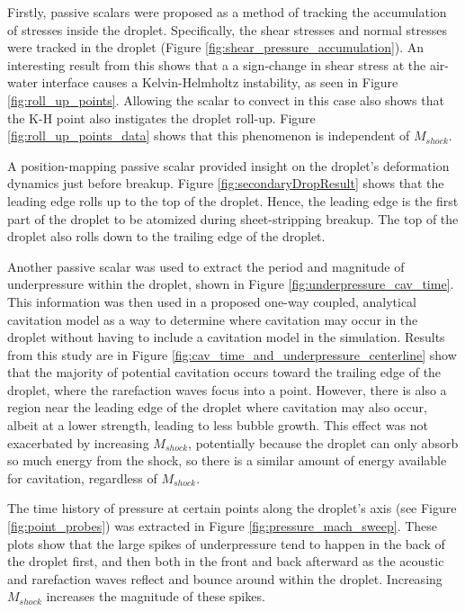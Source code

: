 \documentclass{UCF_ETD}
\begin{document}
Firstly, passive scalars were proposed as a method of tracking the accumulation of stresses inside the droplet. Specifically, the shear stresses and normal stresses were tracked in the droplet (Figure \ref{fig:shear_pressure_accumulation}). An interesting result from this shows that a a sign-change in shear stress at the air-water interface causes a Kelvin-Helmholtz instability, as seen in Figure \ref{fig:roll_up_points}. Allowing the scalar to convect in this case also shows that the K-H point also instigates the droplet roll-up. Figure \ref{fig:roll_up_points_data} shows that this phenomenon is independent of $M_{shock}$.

A position-mapping passive scalar provided insight on the droplet's deformation dynamics just before breakup. Figure \ref{fig:secondaryDropResult} shows that the leading edge rolls up to the top of the droplet. Hence, the leading edge is the first part of the droplet to be atomized during sheet-stripping breakup. The top of the droplet also rolls down to the trailing edge of the droplet. 

Another passive scalar was used to extract the period and magnitude of underpressure within the droplet, shown in Figure \ref{fig:underpressure_cav_time}. This information was then used in a proposed one-way coupled, analytical cavitation model as a way to determine where cavitation may occur in the droplet without having to include a cavitation model in the simulation. Results from this study are in Figure \ref{fig:cav_time_and_underpressure_centerline} show that the majority of potential cavitation occurs toward the trailing edge of the droplet, where the rarefaction waves focus into a point. However, there is also a region near the leading edge of the droplet where cavitation may also occur, albeit at a lower strength, leading to less bubble growth. This effect was not exacerbated by increasing $M_{shock}$, potentially because the droplet can only absorb so much energy from the shock, so there is a similar amount of energy available for cavitation, regardless of $M_{shock}$.

The time history of pressure at certain points along the droplet's axis (see Figure \ref{fig:point_probes}) was extracted in Figure \ref{fig:pressure_mach_sweep}. These plots show that the large spikes of underpressure tend to happen in the back of the droplet first, and then both in the front and back afterward as the acoustic and rarefaction waves reflect and bounce around within the droplet. Increasing $M_{shock}$ increases the magnitude of these spikes.
\end{document}

